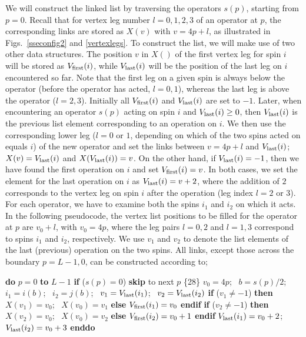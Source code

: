 \documentclass[draft,numberedheadings]{aipproc}
\newcommand{\code}{\null\vskip-2mm\noindent}
\newcommand{\br}{\hfill\break}
\newcommand{\cia}{\null\hskip5mm}
\newcommand{\cib}{\null\hskip10mm}
\begin{document}
We will construct the linked list by traversing the operators $s(p)$, starting from $p=0$. Recall that for vertex leg number $l=0,1,2,3$ of an operator 
at $p$, the corresponding links are stored as $X(v)$ with $v=4p+l$, as illustrated in Figs.~\ref{sseconfig2} and \ref{vertexlegs}. To construct the list, 
we will make use of two other data structures. The position $v$ in $X()$ of the first vertex leg for spin $i$ will be stored as $V_{\rm first}(i)$, while 
$V_{\rm last}(i)$ will be the position of the last leg on $i$ encountered so far. Note that the first leg on a given spin is always below the operator (before 
the operator has acted, $l=0,1$), whereas the last leg is above the operator ($l=2,3$). Initially all $V_{\rm first}(i)$ and $V_{\rm last}(i)$ are set to $-1$. 
Later, when encountering an operator $s(p)$ acting on spin $i$ and $V_{\rm last}(i)\ge 0$, then $V_{\rm last}(i)$ is the previous list element corresponding
to an operation on $i$. We then use the corresponding lower leg ($l=0$ or $1$, depending on which of the two spins acted on equals $i$) of the new operator 
and set the links between $v=4p+l$ and $V_{\rm last}(i)$; $X(v)=V_{\rm last}(i)$ and $X(V_{\rm last}(i))=v$. On the other hand, if $V_{\rm last}(i)=-1$, then we 
have found the first operation on $i$ and set $V_{\rm first}(i)=v$. In both cases, we set the element for the last operation on $i$ as $V_{\rm last}(i)=v+2$, 
where the addition of $2$ corresponds to the vertex leg on spin $i$ after the operation (leg index $l=2$ or $3$). For each operator, we have to examine both 
the spins $i_1$ and $i_2$ on which it acts. In the following pseudocode, the vertex list positions to be filled for the operator at $p$ are $v_0+l$, with $v_0=4p$, 
where the leg pairs $l=0,2$ and $l=1,3$ correspond to spins $i_1$ and $i_2$, respectively. We use $v_1$ and $v_2$ to denote the list elements of the last (previous) 
operation on the two spins. All links, except those across the boundary $p=L-1,0$, can be constructed according to;

{\code
\cia    {\bf do} $p=0$ {\bf to} $L-1$ \br
\cib       {\bf if} ($s(p)=0$) {\bf skip} {\rm to next} $p$  \hfill \{28\} \break
\cib       $v_0=4p$;~ $b=s(p)/2$;~ $i_1=i(b)$;~ $i_2=j(b)$;~ $v_1=V_{\rm last}(i_1)$;~ $v_2=V_{\rm last}(i_2)$ \br
\cib       {\bf if} ($v_1\not=-1$) {\bf then} $X(v_1)=v_0$;~ $X(v_0)=v_1$ {\bf else}  $V_{\rm first}(i_1)=v_0$ {\bf endif} \br
\cib       {\bf if} ($v_2\not=-1$) {\bf then} $X(v_2)=v_0$;~ $X(v_0)=v_2$ {\bf else}  $V_{\rm first}(i_2)=v_0+1$ {\bf endif} \br
\cib       $V_{\rm last}(i_1)=v_0+2$;~ $V_{\rm last}(i_2)=v_0+3$ \br 
\cia    {\bf enddo} 
\code}
\end{document}
